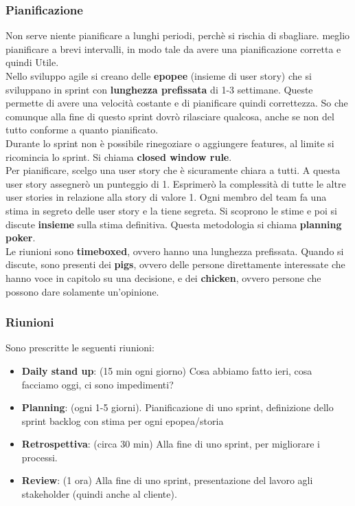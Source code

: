 \documentclass[a4paper,12pt]{article}
\begin{document}
\subsubsection{Pianificazione}
Non serve niente pianificare a lunghi periodi, perchè si rischia di sbagliare. \E meglio pianificare a brevi intervalli, in modo tale da avere una pianificazione corretta e quindi Utile.\\
Nello sviluppo agile si creano delle \textbf{epopee} (insieme di user story) che si sviluppano in sprint con \textbf{lunghezza prefissata} di 1-3 settimane. Queste permette di avere una velocità costante e di pianificare quindi correttezza. So che comunque alla fine di questo sprint dovrò rilasciare qualcosa, anche se non del tutto conforme a quanto pianificato.\\
Durante lo sprint non è possibile rinegoziare o aggiungere features, al limite si ricomincia lo sprint. Si chiama \textbf{closed window rule}.\\
Per pianificare, scelgo una user story che è sicuramente chiara a tutti. A questa user story assegnerò un punteggio di 1. Esprimerò la complessità di tutte le altre user stories in relazione alla story di valore 1. Ogni membro del team fa una stima in segreto delle user story e la tiene segreta. Si scoprono le stime e poi si discute \textbf{insieme} sulla stima definitiva. Questa metodologia si chiama \textbf{planning poker}.\\
Le riunioni sono \textbf{timeboxed}, ovvero hanno una lunghezza prefissata. Quando si discute, sono presenti dei \textbf{pigs}, ovvero delle persone direttamente interessate che hanno voce in capitolo su una decisione, e dei \textbf{chicken}, ovvero persone che possono dare solamente un'opinione.

\subsubsection{Riunioni}
Sono prescritte le seguenti riunioni:
\begin{itemize}
\item \textbf{Daily stand up}: (15 min ogni giorno) Cosa abbiamo fatto ieri, cosa facciamo oggi, ci sono impedimenti?
\item \textbf{Planning}: (ogni 1-5 giorni). Pianificazione di uno sprint, definizione dello sprint backlog con stima per ogni epopea/storia
\item \textbf{Retrospettiva}: (circa 30 min) Alla fine di uno sprint, per migliorare i processi.
\item \textbf{Review}: (1 ora) Alla fine di uno sprint, presentazione del lavoro agli stakeholder (quindi anche al cliente).
\end{itemize}
\end{document}
